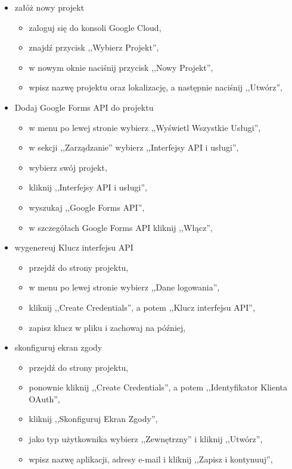 \begin{itemize}
  \item załóż nowy projekt
    \begin{itemize}
      \item zaloguj się do konsoli Google Cloud,
      \item znajdź przycisk ,,Wybierz Projekt'',
      \item w nowym oknie naciśnij przycisk ,,Nowy Projekt'',
      \item wpisz nazwę projektu oraz lokalizację, a następnie naciśnij ,,Utwórz'',
    \end{itemize}
  \item  Dodaj Google Forms API do projektu
    \begin{itemize}
      \item w menu po lewej stronie wybierz ,,Wyświetl Wszystkie Usługi'',
      \item w sekcji ,,Zarządzanie'' wybierz ,,Interfejsy API i usługi'',
      \item wybierz swój projekt,
      \item kliknij ,,Interfejsy API i usługi'',
      \item wyszukaj ,,Google Forms API'',
      \item w szczegółach Google Forms API kliknij ,,Włącz'',
    \end{itemize}
  \item wygenereuj Klucz interfejsu API
    \begin{itemize}
      \item przejdź do strony projektu,
      \item w menu po lewej stronie wybierz ,,Dane logowania'',
      \item kliknij ,,Create Credentials'', a potem ,,Klucz interfejsu API'',
      \item zapisz klucz w pliku i zachowaj na później,
    \end{itemize}
  \item skonfiguruj ekran zgody
    \begin{itemize}
      \item przejdź do strony projektu,
      \item ponownie kliknij ,,Create Credentials'', a potem 
            ,,Identyfikator Klienta OAuth'',
      \item kliknij ,,Skonfiguruj Ekran Zgody'',
      \item jako typ użytkownika wybierz ,,Zewnętrzny'' i kliknij ,,Utwórz'',
      \item wpisz nazwę aplikacji, adresy e-mail i kliknij ,,Zapisz i kontynuuj'',

\end{itemize}
\end{itemize}
